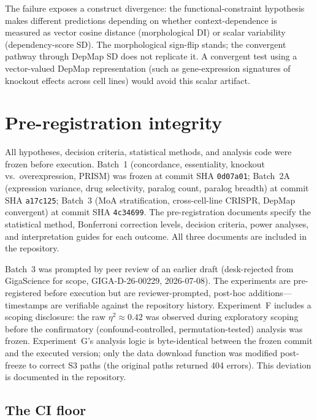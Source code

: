 \documentclass[11pt]{article}
\begin{document}
The failure exposes a construct divergence: the
functional-constraint hypothesis makes different predictions depending
on whether context-dependence is measured as vector cosine distance
(morphological DI) or scalar variability (dependency-score SD).  The
morphological sign-flip stands; the convergent pathway through DepMap SD
does not replicate it.  A convergent test using a vector-valued DepMap
representation (such as gene-expression signatures of knockout effects
across cell lines) would avoid this scalar artifact.


\section{Pre-registration integrity}
\label{sec:integrity}

All hypotheses, decision criteria, statistical methods, and analysis
code were frozen before execution.  Batch~1
(concordance, essentiality, knockout vs.\ overexpression, PRISM) was
frozen at commit SHA \texttt{0d07a01}; Batch~2A (expression variance,
drug selectivity, paralog count, paralog breadth) at commit SHA
\texttt{a17c125}; Batch~3 (MoA stratification, cross-cell-line CRISPR,
DepMap convergent) at commit SHA \texttt{4c34699}.  The pre-registration
documents specify the statistical method, Bonferroni correction levels,
decision criteria, power analyses, and interpretation guides for each
outcome.  All three documents are included in the repository.

Batch~3 was prompted by peer review of an earlier draft (desk-rejected
from GigaScience for scope, GIGA-D-26-00229, 2026-07-08).  The
experiments are pre-registered before execution but are
reviewer-prompted, post-hoc additions---timestamps are verifiable
against the repository history.  Experiment~F includes a scoping
disclosure: the raw $\eta^2 \approx 0.42$ was observed during
exploratory scoping before the confirmatory (confound-controlled,
permutation-tested) analysis was frozen.  Experiment~G's analysis logic
is byte-identical between the frozen commit and the executed version;
only the data download function was modified post-freeze to correct S3
paths (the original paths returned 404 errors).  This deviation is
documented in the repository.

\subsection{The CI floor}
\end{document}
